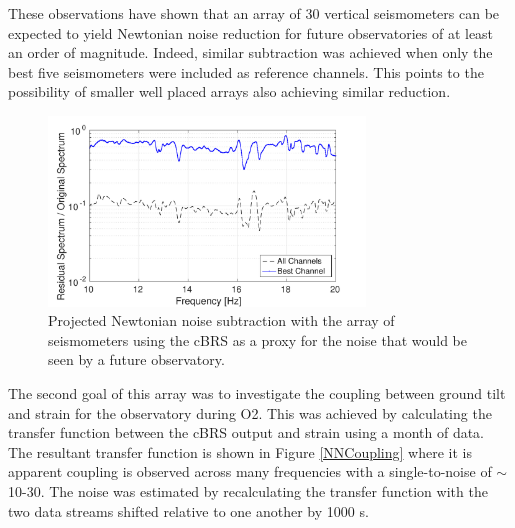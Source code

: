 \documentclass [12pt, proquest]{uwthesis}[2019]
\begin{document}
These observations have shown that an array of 30 vertical seismometers can be expected to yield Newtonian noise reduction for future observatories of at least an order of magnitude. Indeed, similar subtraction was achieved when only the best five seismometers were included as reference channels. This points to the possibility of smaller well placed arrays also achieving similar reduction.

\begin{figure}[!h]
\begin{center}
\includegraphics[width=0.75\textwidth]{NNSubtraction.pdf}
\end{center}
\caption[Projected Newtonian noise subtraction with the array of seismometers]{Projected Newtonian noise subtraction with the array of seismometers using the cBRS as a proxy for the noise that would be seen by a future observatory.}
\label{NNSub}
\end{figure}

The second goal of this array was to investigate the coupling between ground tilt and strain for the observatory during O2. This was achieved by calculating the transfer function between the cBRS output and strain using a month of data. The resultant transfer function is shown in Figure \ref{NNCoupling} where it is apparent coupling is observed across many frequencies with a single-to-noise of $\sim$10-30. The noise was estimated by recalculating the transfer function with the two data streams shifted relative to one another by 1000 s. 
\end{document}
